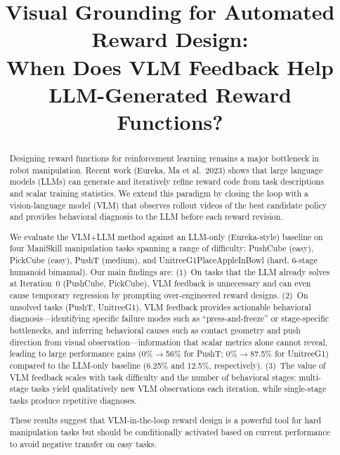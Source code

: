 \documentclass[conference]{IEEEtran}
\begin{document}
\title{Visual Grounding for Automated Reward Design:\\
When Does VLM Feedback Help LLM-Generated Reward Functions?}

\author{}

\maketitle

\begin{abstract}
Designing reward functions for reinforcement learning remains a major bottleneck
in robot manipulation. Recent work (Eureka, Ma et al.\ 2023) shows that large
language models (LLMs) can generate and iteratively refine reward code from task
descriptions and scalar training statistics. We extend this paradigm by closing
the loop with a vision-language model (VLM) that observes rollout videos of the
best candidate policy and provides behavioral diagnosis to the LLM before each
reward revision.

We evaluate the VLM+LLM method against an LLM-only (Eureka-style) baseline on
four ManiSkill manipulation tasks spanning a range of difficulty: PushCube
(easy), PickCube (easy), PushT (medium), and UnitreeG1PlaceAppleInBowl (hard,
6-stage humanoid bimanual). Our main findings are:
(1)~On tasks that the LLM already solves at Iteration~0 (PushCube, PickCube),
VLM feedback is unnecessary and can even cause temporary regression by
prompting over-engineered reward designs.
(2)~On unsolved tasks (PushT, UnitreeG1), VLM feedback provides actionable
behavioral diagnosis---identifying specific failure modes such as
``press-and-freeze'' or stage-specific bottlenecks, and inferring behavioral
causes such as contact geometry and push direction from visual
observation---information that scalar metrics alone cannot reveal, leading to large performance gains (0\%$\to$56\% for PushT;
0\%$\to$87.5\% for UnitreeG1) compared to the LLM-only baseline (6.25\% and
12.5\%, respectively).
(3)~The value of VLM feedback scales with task difficulty and the number of
behavioral stages: multi-stage tasks yield qualitatively new VLM observations
each iteration, while single-stage tasks produce repetitive diagnoses.

These results suggest that VLM-in-the-loop reward design is a powerful tool for
hard manipulation tasks but should be conditionally activated based on current
performance to avoid negative transfer on easy tasks.
\end{abstract}
\end{document}

